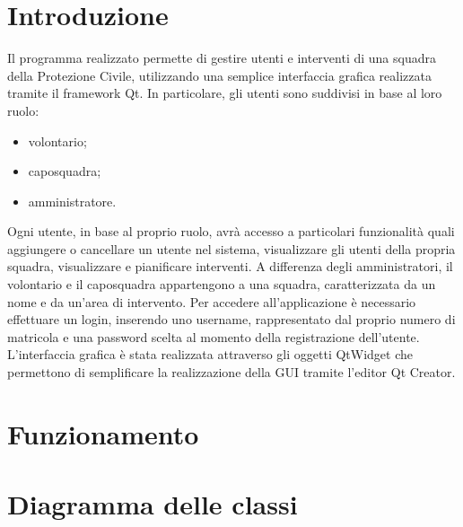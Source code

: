 \section{Introduzione}
Il programma realizzato permette di gestire utenti e interventi di una squadra della Protezione Civile, utilizzando una semplice interfaccia grafica realizzata tramite il framework Qt.
In particolare, gli utenti sono suddivisi in base al loro ruolo:
\begin{itemize}
	\item volontario;
	\item caposquadra;
	\item amministratore.
\end{itemize}
Ogni utente, in base al proprio ruolo, avrà accesso a particolari funzionalità quali aggiungere o cancellare un utente nel sistema, visualizzare gli utenti della propria squadra, visualizzare e pianificare interventi. A differenza degli amministratori, il volontario e il caposquadra appartengono a una squadra, caratterizzata da un nome e da un'area di intervento. 
Per accedere all'applicazione è necessario effettuare un login, inserendo uno username, rappresentato dal proprio numero di matricola e una password scelta al momento della registrazione dell'utente.
L'interfaccia grafica è stata realizzata attraverso gli oggetti QtWidget che permettono di semplificare la realizzazione della GUI tramite l'editor Qt Creator.



\section{Funzionamento}



\section{Diagramma delle classi}
